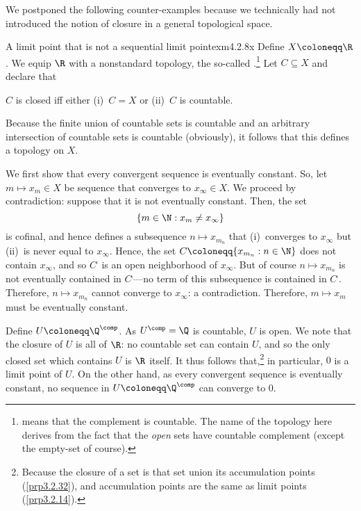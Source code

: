 We postponed the following counter-examples because we technically had not introduced the notion of closure in a general topological space.
\begin{exm}{A limit point that is not a sequential limit point}{exm4.2.8x}
Define $X\coloneqq \R$.  We equip $\R$ with a nonstandard topology, the so-called .\footnote{ means that the complement is countable.  The name of the topology here derives from the fact that the \emph{open} sets have countable complement (except the empty-set of course).}  Let $C\subseteq X$ and declare that
\begin{textequation}
$C$ is closed iff either (i)~$C=X$ or (ii)~$C$ is countable.
\end{textequation}
Because the finite union of countable sets is countable and an arbitrary intersection of countable sets is countable (obviously), it follows that this defines a topology on $X$.

We first show that every convergent sequence is eventually constant.  So, let $m\mapsto x_m\in X$ be sequence that converges to $x_\infty \in X$.  We proceed by contradiction:  suppose that it is not eventually constant.  Then, the set
\begin{equation}
\{ m\in \N :x_m\neq x_\infty \}
\end{equation}
is cofinal, and hence defines a subsequence $n\mapsto x_{m_n}$ that (i)~converges to $x_\infty$ but (ii)~is never equal to $x_\infty$.  Hence, the set $C\coloneqq \{ x_{m_n}:n\in \N \}$ does not contain $x_\infty$, and so $C^{\comp}$ is an open neighborhood of $x_\infty$.  But of course $n\mapsto x_{m_n}$ is not eventually contained in $C^{\comp}$---no term of this subsequence is contained in $C^{\comp}$.  Therefore, $n\mapsto x_{m_n}$ cannot converge to $x_\infty$:  a contradiction.  Therefore, $m\mapsto x_m$ must be eventually constant.

Define $U\coloneqq \Q ^{\comp}$.  As $U^{\comp}=\Q$ is countable, $U$ is open.  We note that the closure of $U$ is all of $\R$:  no countable set can contain $U$, and so the only closed set which contains $U$ is $\R$ itself.  It thus follows that,\footnote{Because the closure of a set is that set union its accumulation points (\cref{prp3.2.32}), and accumulation points are the same as limit points (\cref{prp3.2.14}).} in particular, $0$ is a limit point of $U$.  On the other hand, as every convergent sequence is eventually constant, no sequence in $U\coloneqq \Q ^{\comp}$ can converge to $0$.
\end{exm}
